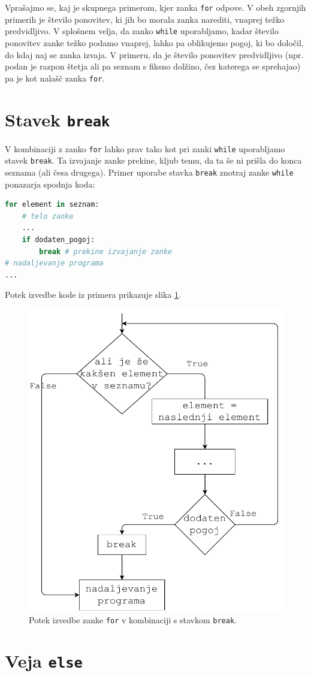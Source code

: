 Vprašajmo se, kaj je skupnega primerom, kjer zanka \texttt{for} odpove. V obeh zgornjih primerih je število ponovitev, ki jih bo morala zanka narediti, vnaprej težko predvidljivo. V splošnem velja, da zanko \texttt{while} uporabljamo, kadar število ponovitev zanke težko podamo vnaprej, lahko pa oblikujemo pogoj, ki bo določil, do kdaj naj se zanka izvaja. V primeru, da je število ponovitev predvidljivo (npr. podan je razpon štetja ali pa seznam s fiksno dolžino, čez katerega se sprehajao) pa je kot nalašč zanka \texttt{for}.

\section{Stavek \texttt{break}}

V kombinaciji z zanko \texttt{for} lahko prav tako kot pri zanki \texttt{while} uporabljamo stavek \texttt{break}. Ta izvajanje zanke prekine, kljub temu, da ta še ni prišla do konca seznama (ali česa drugega). Primer uporabe stavka \texttt{break} znotraj zanke \texttt{while} ponazarja spodnja koda:
\begin{lstlisting}[language=Python]
for element in seznam:
    # telo zanke
    ...
    if dodaten_pogoj: 
        break # prekine izvajanje zanke
# nadaljevanje programa
...
\end{lstlisting}
Potek izvedbe kode iz primera prikazuje slika \ref{img:for2}.
\begin{figure}
    \centering
    \includegraphics[width=0.5\linewidth]{img/for2.pdf}
    \caption{Potek izvedbe zanke \texttt{for} v kombinaciji s stavkom \texttt{break}.}
    \label{img:for2}
\end{figure}


\section{Veja \texttt{else}}

